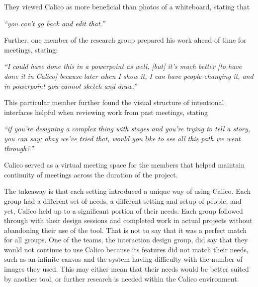 They viewed Calico as more beneficial than photos of a whiteboard, stating that 

\begin{myindentpar}{1cm}
\emph{``you can't go back and edit that.''}
\end{myindentpar}

Further, one member of the research group prepared his work ahead of time for meetings, stating:

\begin{myindentpar}{1cm}
\emph{``I could have done this in a powerpoint as well, [but] it's much better [to have done it in Calico] because later when I show it, I can have people changing it, and in powerpoint you cannot sketch and draw.''}
\end{myindentpar}

This particular member further found the visual structure of intentional interfaces helpful when reviewing work from past meetings, stating 

\begin{myindentpar}{1cm}
\emph{``if you're designing a complex thing with stages and you're trying to tell a story, you can say: okay we've tried that, would you like to see all this path we went through?''}
\end{myindentpar}

Calico served as a virtual meeting space for the members that helped maintain continuity of meetings across the duration of the project.

%

The takeaway is that each setting introduced a unique way of using Calico. Each group had a different set of needs, a different setting and setup of people, and yet, Calico held up to a significant portion of their needs. Each group followed through with their design sessions and completed work in actual projects without abandoning their use of the tool. That is not to say that it was a perfect match for all groups. One of the teams, the interaction design group, did say that they would not continue to use Calico because its features did not match their needs, such as an infinite canvas and the system having difficulty with the number of images they used. This may either mean that their needs would be better suited by another tool, or further research is needed within the Calico environment.


